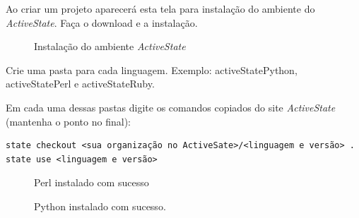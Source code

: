 \documentclass[a4paper,11pt]{article}
\begin{document}
Ao criar um projeto aparecerá esta tela para instalação do ambiente do \textit{ActiveState}. Faça o download e a instalação.
\begin{figure}[H]
	\centering
	\caption{Instalação do ambiente \textit{ActiveState}}
	\label{fig:activeState_install}
\end{figure}

Crie uma pasta para cada linguagem. Exemplo: activeStatePython, activeStatePerl e activeStateRuby.

Em cada uma dessas pastas digite os comandos copiados do site \textit{ActiveState} (mantenha o ponto no final):


\begin{verbatim}
state checkout <sua organização no ActiveSate>/<linguagem e versão> .
state use <linguagem e versão>
\end{verbatim}

\begin{figure}[H]
	\centering
	\caption{Perl instalado com sucesso}
	\label{fig:perl_install_1}
\end{figure}

\begin{figure}[H]
	\centering
	\caption{Python instalado com sucesso.}
	\label{fig:python_install_1}
\end{figure}
\end{document}

